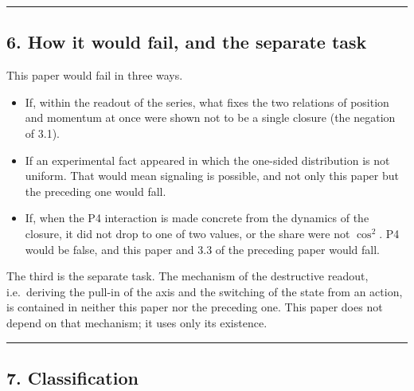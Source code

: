 \documentclass[
  a4paper,
]{article}
\providecommand{\tightlist}{%
  \setlength{\itemsep}{0pt}\setlength{\parskip}{0pt}}
\begin{document}
\begin{center}\rule{0.5\linewidth}{0.5pt}\end{center}

\subsection{6. How it would fail, and the separate
task}\label{how-it-would-fail-and-the-separate-task}

This paper would fail in three ways.

\begin{itemize}
\tightlist
\item
  If, within the readout of the series, what fixes the two relations of
  position and momentum at once were shown not to be a single closure
  (the negation of 3.1).
\item
  If an experimental fact appeared in which the one-sided distribution
  is not uniform. That would mean signaling is possible, and not only
  this paper but the preceding one would fall.
\item
  If, when the P4 interaction is made concrete from the dynamics of the
  closure, it did not drop to one of two values, or the share were not
  \(\cos^2\). P4 would be false, and this paper and 3.3 of the preceding
  paper would fall.
\end{itemize}

The third is the separate task. The mechanism of the destructive
readout, i.e.~deriving the pull-in of the axis and the switching of the
state from an action, is contained in neither this paper nor the
preceding one. This paper does not depend on that mechanism; it uses
only its existence.

\begin{center}\rule{0.5\linewidth}{0.5pt}\end{center}

\subsection{7. Classification}\label{classification}
\end{document}
